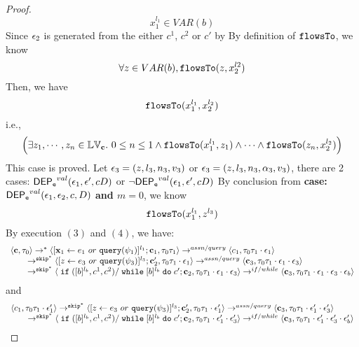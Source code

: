 \begin{proof}
 \[
  x_1^{l_1} \in VAR(b)
 \]
 Since $\mathtt{\epsilon}_2$ is generated from the either $c^1$, $c^2$ or $c'$ by 
 By definition of $\mathtt{flowsTo}$, we know
 \[
 \forall z \in VAR(b), \mathtt{flowsTo}(z, x_2^{l2})
 \]
 Then, we have
 \[
 \mathtt{flowsTo}(x_1^{l_1}, x_2^{l_2})
 \]
 i.e.,
 \[
 \Big( \exists z_1, \cdots, z_n \in \mathbb{LV}_{{\boldsymbol{\mathbf{c}}}}. ~ 0 \leq n \leq 1 \land
  \mathtt{flowsTo}(x_1^{l_1}, z_1) 
  \land \cdots \land \mathtt{flowsTo}(z_n, x_2^{l_2}) \Big)
 \]
  This case is proved.
%
\subcaseL{$\event_3 \in \eventset^{\asn}$}
Let $\mathtt{\epsilon}_3 = (z, l_3, n_3, v_3)$ or $\mathtt{\epsilon}_3 = (z, l_3, n_3, \alpha_3, v_3)$, there are 2 cases:
$\mathsf{DEP_{\mathtt{e}}}^{val}(\mathtt{\epsilon}_1, \mathtt{\epsilon}', c D)$ or $\neg \mathsf{DEP_{\mathtt{e}}}^{val}(\mathtt{\epsilon}_1, \mathtt{\epsilon}', c D)$
%
%
By conclusion from \textbf{case: $\mathsf{DEP_{\mathtt{e}}}^{val}(\mathtt{\epsilon}_1, \mathtt{\epsilon}_2, c, D)$ and $m = 0$}, we know
\[
  \mathtt{flowsTo}(x_1^{l_1}, z^{l_3})
\]
%
By execution $(3)$ and $(4)$, we have:
\[
  \begin{array}{l}   
  \langle {\boldsymbol{\mathbf{c}}}, \mathtt{\tau}_0 \rangle 
  \rightarrow^{*} 
  \langle [\mathrel{ {\boldsymbol{\mathbf{x}}}_1 \leftarrow e_1~ or ~ {\tt query}(\psi_1) }]^{l_1} ; {\boldsymbol{\mathbf{c}}}_1, \mathtt{\tau}_0 \mathtt{\tau}_1 \rangle  \rightarrow^{assn/query}
 \langle c_1, \mathtt{\tau}_0 \mathtt{\tau}_1 \cdot \mathtt{\epsilon}_1 \rangle 
  \\ 
  \qquad \rightarrow^{\mathtt{skip}^*} 
  \langle [\mathrel{ z \leftarrow e_3~ or ~ {\tt query}(\psi_3) }]^{l_3}; {\boldsymbol{\mathbf{c}}}_2', 
  \mathtt{\tau}_0 \mathtt{\tau}_1 \cdot \mathtt{\epsilon}_1 \rangle 
  \rightarrow^{assn / query} 
  \langle {\boldsymbol{\mathbf{c}}}_3,  \mathtt{\tau}_0 \mathtt{\tau}_1 \cdot \mathtt{\epsilon}_1 \cdot \mathtt{\epsilon}_3 \rangle 
  \\ 
  \qquad \rightarrow^{\mathtt{skip}^*} 
  \langle \;\mathtt{if}\;([b]{}^{l_b}, c^1, c^2) / \;\mathtt{while}\; [b]{}^{l_b} \;\mathtt{do}\; c'; {\boldsymbol{\mathbf{c}}}_2, 
  \mathtt{\tau}_0 \mathtt{\tau}_1 \cdot \mathtt{\epsilon}_1 \cdot \mathtt{\epsilon}_3 \rangle 
  \rightarrow^{if / while} 
  \langle {\boldsymbol{\mathbf{c}}}_3,  \mathtt{\tau}_0 \mathtt{\tau}_1 \cdot \mathtt{\epsilon}_1 \cdot \mathtt{\epsilon}_3 \cdot \mathtt{\epsilon}_b \rangle 
\end{array}
 \]
and 
 \[
  \begin{array}{l}   
  \langle c_1, \mathtt{\tau}_0 \mathtt{\tau}_1 \cdot \mathtt{\epsilon}_1' \rangle 
  \rightarrow^{\mathtt{skip}^*} 
  \langle [\mathrel{ z \leftarrow e_3~ or ~ {\tt query}(\psi_3) }]^{l_3}; {\boldsymbol{\mathbf{c}}}_2', 
  \mathtt{\tau}_0 \mathtt{\tau}_1 \cdot \mathtt{\epsilon}_1' \rangle 
  \rightarrow^{assn / query} 
  \langle {\boldsymbol{\mathbf{c}}}_3,  \mathtt{\tau}_0 \mathtt{\tau}_1 \cdot \mathtt{\epsilon}_1' \cdot \mathtt{\epsilon}_3' \rangle 
  \\ 
  \qquad \rightarrow^{\mathtt{skip}^*} 
  \langle \;\mathtt{if}\;([b]{}^{l_b}, c^1, c^2) / \;\mathtt{while}\; [b]{}^{l_b} \;\mathtt{do}\; c'; {\boldsymbol{\mathbf{c}}}_2, 
  \mathtt{\tau}_0 \mathtt{\tau}_1 \cdot \mathtt{\epsilon}_1' \cdot \mathtt{\epsilon}_3' \rangle 
  \rightarrow^{if / while} 
  \langle {\boldsymbol{\mathbf{c}}}_3,  \mathtt{\tau}_0 \mathtt{\tau}_1 \cdot \mathtt{\epsilon}_1' \cdot \mathtt{\epsilon}_3' \cdot \mathtt{\epsilon}_b' \rangle 

\end{array}\]
\end{proof}

